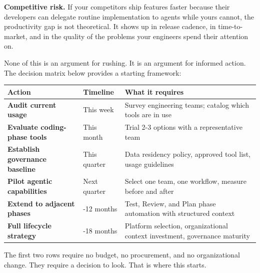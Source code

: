 \documentclass[
  a4paper,
  DIV=11,
  numbers=noendperiod]{scrreprt}
\newcounter{none} %
\begin{document}
\textbf{Competitive risk.} If your competitors ship features faster
because their developers can delegate routine implementation to agents
while yours cannot, the productivity gap is not theoretical. It shows up
in release cadence, in time-to-market, and in the quality of the
problems your engineers spend their attention on.

None of this is an argument for rushing. It is an argument for informed
action. The decision matrix below provides a starting framework:

{\def\LTcaptype{none} %
\begin{longtable}[]{@{}
  >{\raggedright\arraybackslash}p{}
  >{\raggedright\arraybackslash}p{}
  >{\raggedright\arraybackslash}p{}@{}}
\toprule\noalign{}
\begin{minipage}[b]{\linewidth}\raggedright
Action
\end{minipage} & \begin{minipage}[b]{\linewidth}\raggedright
Timeline
\end{minipage} & \begin{minipage}[b]{\linewidth}\raggedright
What it requires
\end{minipage} \\
\midrule\noalign{}
\endhead
\bottomrule\noalign{}
\endlastfoot
\textbf{Audit current usage} & This week & Survey engineering teams;
catalog which tools are in use \\
\textbf{Evaluate coding-phase tools} & This month & Trial 2-3 options
with a representative team \\
\textbf{Establish governance baseline} & This quarter & Data residency
policy, approved tool list, usage guidelines \\
\textbf{Pilot agentic capabilities} & Next quarter & Select one team,
one workflow, measure before and after \\
\textbf{Extend to adjacent phases} & 6-12 months & Test, Review, and
Plan phase automation with structured context \\
\textbf{Full lifecycle strategy} & 12-18 months & Platform selection,
organizational context investment, governance maturity \\
\end{longtable}
}

The first two rows require no budget, no procurement, and no
organizational change. They require a decision to look. That is where
this starts.
\end{document}
